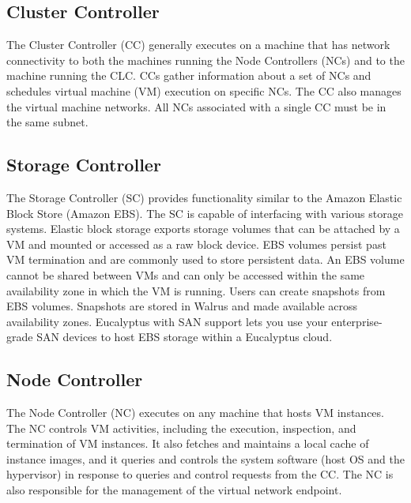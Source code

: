 \subsection{Cluster Controller}
The Cluster Controller (CC) generally executes on a machine that has network connectivity to both the machines running the Node Controllers (NCs) and to the machine running the CLC. CCs gather information about a set of NCs and schedules virtual machine (VM) execution on specific NCs. The CC also manages the virtual machine networks. All NCs associated with a single CC must be in the same subnet.
\subsection{Storage Controller}
The Storage Controller (SC) provides functionality similar to the Amazon Elastic Block Store (Amazon EBS). The SC is capable of interfacing with various storage systems. Elastic block storage exports storage volumes that can be attached by a VM and mounted or accessed as a raw block device. EBS volumes persist past VM termination and are commonly used to store persistent data. An EBS volume cannot be shared between VMs and can only be accessed within the same availability zone in which the VM is running. Users can create snapshots from EBS volumes. Snapshots are stored in Walrus and made available across availability zones. Eucalyptus with SAN support lets you use your enterprise-grade SAN devices to host EBS storage within a Eucalyptus cloud.
\subsection{Node Controller}
The Node Controller (NC) executes on any machine that hosts VM instances. The NC controls VM activities, including the execution, inspection, and termination of VM instances. It also fetches and maintains a local cache of instance images, and it queries and controls the system software (host OS and the hypervisor) in response to queries and control requests from the CC. The NC is also responsible for the management of the virtual network endpoint.

